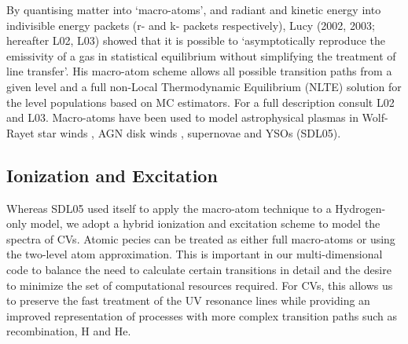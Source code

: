 \documentclass[preprint, a4paper, 11pt]{aastex}
\begin{document}
{By quantising matter into `macro-atoms', and radiant and kinetic 
energy into indivisible energy packets (r- and k- packets respectively), 
Lucy (2002, 2003\nocite{lucy2002, lucy2003}; hereafter L02, L03) showed that it is possible 
to `asymptotically reproduce the emissivity of a gas in statistical equilibrium 
without simplifying the treatment of line transfer'. 
His macro-atom scheme allows all possible transition paths from a given level and a full non-Local 
Thermodynamic Equilibrium (NLTE) solution for the level populations based on MC estimators. 
For a full description consult L02 and L03. 
Macro-atoms have been used to model astrophysical plasmas in 
Wolf-Rayet star winds \citep{sim2004}, AGN disk winds \citep{simlong2008, tatum2012},
supernovae \citep{kasen2006, kerzendorfsim} and YSOs (SDL05).


\subsection{Ionization and Excitation}

Whereas SDL05 used \py itself to apply the macro-atom 
technique to a Hydrogen-only model, we
adopt a hybrid ionization and excitation scheme to model the spectra of CVs. 
Atomic pecies can be treated as either full macro-atoms
or using the two-level atom approximation.  This is  important in our multi-dimensional code to balance the need to calculate certain transitions in detail and the desire to minimize the set of
computational resources required.  For CVs, this allows us 
to preserve the fast treatment of the UV resonance lines while providing 
an improved representation of processes with more complex
transition paths such as recombination, H and He. %




}
\end{document}

